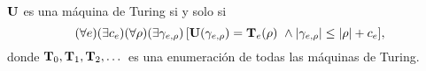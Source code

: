 





\begin{definicion}[\Optity]\label{intro:def:optimal}
 ${\bf U}$ es una máquina de Turing {\em \opt}  si y solo si
$$
(\forall e)(\exists c_e)(\forall \rho)(\exists \gamma_{e,\rho})\,
[{\bf U}(\gamma_{e,\rho})={\bf T}_e(\rho) \ \wedge | \gamma_{e,\rho} |\leq
| \rho |+c_e],
$$
donde ${\bf T}_0,{\bf T}_1,{\bf T}_2,\dots$ es una enumeración de todas las máquinas de Turing.
\end{definicion}




